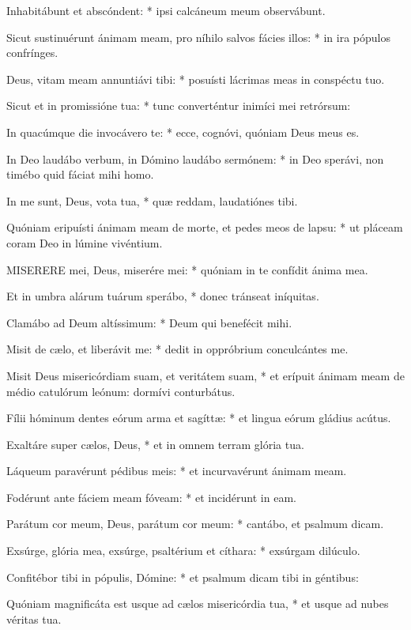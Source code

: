 Inhabitábunt et abscóndent: * ipsi calcáneum meum observábunt.

Sicut sustinuérunt ánimam meam, pro níhilo salvos fácies illos: * in ira pópulos confrínges.

Deus, vitam meam annuntiávi tibi: * posuísti lácrimas meas in conspéctu tuo.

Sicut et in promissióne tua: * tunc converténtur inimíci mei retrórsum:

In quacúmque die invocávero te: * ecce, cognóvi, quóniam Deus meus es.

In Deo laudábo verbum, in Dómino laudábo sermónem: * in Deo sperávi, non timébo quid fáciat mihi homo.

In me sunt, Deus, vota tua, * quæ reddam, laudatiónes tibi.

Quóniam eripuísti ánimam meam de morte, et pedes meos de lapsu: * ut pláceam coram Deo in lúmine vivéntium.


\lettrine[lines=2]{M}{ISERERE} mei, Deus, miserére mei: * quóniam in te confídit ánima mea.

Et in umbra alárum tuárum sperábo, * donec tránseat iníquitas.

Clamábo ad Deum altíssimum: * Deum qui benefécit mihi.

Misit de cælo, et liberávit me: * dedit in oppróbrium conculcántes me.

Misit Deus misericórdiam suam, et veritátem suam, * et erípuit ánimam meam de médio catulórum leónum: dormívi conturbátus.

Fílii hóminum dentes eórum arma et sagíttæ: * et lingua eórum gládius acútus.

Exaltáre super cælos, Deus, * et in omnem terram glória tua.

Láqueum paravérunt pédibus meis: * et incurvavérunt ánimam meam.

Fodérunt ante fáciem meam fóveam: * et incidérunt in eam.

Parátum cor meum, Deus, parátum cor meum: * cantábo, et psalmum dicam.

Exsúrge, glória mea, exsúrge, psaltérium et cíthara: * exsúrgam dilúculo.

Confitébor tibi in pópulis, Dómine: * et psalmum dicam tibi in géntibus:

Quóniam magnificáta est usque ad cælos misericórdia tua, * et usque ad nubes véritas tua.


